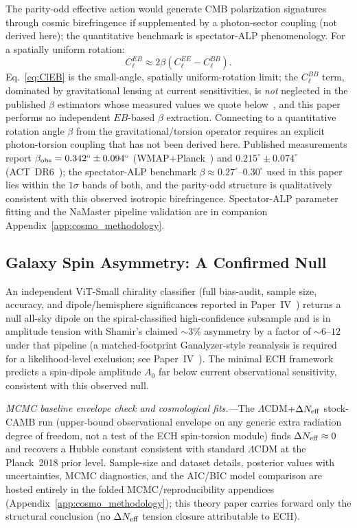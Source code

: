 \documentclass[aps,prd,twocolumn,superscriptaddress,showpacs,preprintnumbers,nofootinbib,longbibliography,floatfix]{revtex4-2}
\newcommand{\Neff}{N_{\rm eff}}
\begin{document}
The parity-odd effective action would generate CMB polarization signatures
through cosmic birefringence if supplemented by a photon-sector coupling
(not derived here); the quantitative benchmark is spectator-ALP
phenomenology. For a spatially uniform rotation:
\begin{equation}\label{eq:ClEB}
C_\ell^{EB}\approx 2\beta\left(C_\ell^{EE}-C_\ell^{BB}\right).
\end{equation}
Eq.~\eqref{eq:ClEB} is the small-angle, spatially uniform-rotation
limit; the $C_\ell^{BB}$ term, dominated by gravitational lensing at
current sensitivities, is \emph{not} neglected in the published
$\beta$ estimators whose measured values we quote
below~\cite{Minami2020,Eskilt2022}, and this paper performs no
independent $E\!B$-based $\beta$ extraction.
Connecting to a quantitative rotation angle $\beta$ from the gravitational/torsion
operator requires an explicit photon-torsion coupling that has not been derived
here. Published measurements report $\beta_{\rm obs} =
0.342^\circ\pm 0.094^\circ$ (WMAP+Planck~\cite{Minami2020,Eskilt2022})
and $0.215^\circ\pm 0.074^\circ$ (ACT~DR6~\cite{DiegoPalazuelos2025});
the spectator-ALP benchmark $\beta\approx 0.27^\circ$--$0.30^\circ$
used in this paper lies within the $1\sigma$ bands of both, and the
parity-odd structure is qualitatively consistent with this observed
isotropic birefringence. Spectator-ALP
parameter fitting and the NaMaster pipeline validation are in companion
Appendix~\ref{app:cosmo_methodology}.

\subsection{Galaxy Spin Asymmetry: A Confirmed Null}\label{sec:spinobs}

An independent ViT-Small chirality classifier (full bias-audit, sample size,
accuracy, and dipole/hemisphere significances reported in
Paper~IV~\cite{Golden2026P4}) returns a null all-sky dipole on the
spiral-classified high-confidence subsample and is in amplitude tension
with Shamir's claimed $\sim\!3\%$ asymmetry by a factor of $\sim\!6$--$12$
under that pipeline (a matched-footprint Ganalyzer-style reanalysis is
required for a likelihood-level exclusion; see
Paper~IV~\cite{Golden2026P4}). The minimal ECH
framework predicts a spin-dipole amplitude $A_0$ far below current
observational sensitivity, consistent with this observed null.

\textit{MCMC baseline envelope check and cosmological fits.}---The $\Lambda$CDM$+\Delta\Neff$
stock-CAMB run (upper-bound observational envelope on any generic extra radiation
degree of freedom, not a test of the ECH spin-torsion module) finds $\Delta\Neff\approx 0$ and recovers a Hubble
constant consistent with standard $\Lambda$CDM at the Planck~2018
prior level. Sample-size and dataset details, posterior values with
uncertainties, MCMC diagnostics, and the AIC/BIC model comparison are
hosted entirely in the folded MCMC/reproducibility appendices (Appendix~\ref{app:cosmo_methodology}); this
theory paper carries forward only the structural conclusion
(no $\Delta\Neff$ tension closure attributable to ECH).
\end{document}

